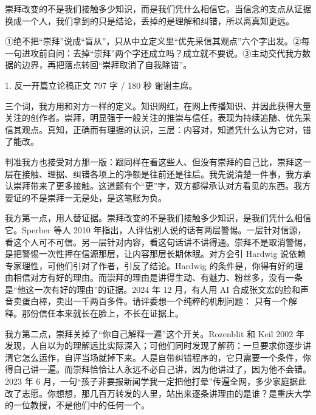 \documentclass[script,con]{debate}
\begin{document}
\debatetitle
\begin{thesisbox}[全场一句话立论]崇拜改变的不是我们接触多少知识，而是我们凭什么相信它。当信念的支点从证据换成一个人，我们拿到的只是结论，丢掉的是理解和纠错，所以离真知更远。\end{thesisbox}
\begin{thesisbox}[全场三条纪律]①绝不把“崇拜”说成“盲从”，只从中立定义里“优先采信其观点”六个字出发。②每一句进攻前自问：去掉“崇拜”两个字还成立吗？成立就不要说。③主动交代我方数据的边界，再把落点转回“崇拜取消了自我除错”。\end{thesisbox}
\begin{speech}{1. 反一开篇立论稿}{正文 797 字 / 180 秒}
谢谢主席。

三个词，我方用和对方一样的定义。知识网红，在网上传播知识、并因此获得大量关注的创作者。崇拜，明显强于一般关注的推崇与信任，表现为持续追随、优先采信其观点。真知，正确而有理据的认识，三层：内容对，知道凭什么认为它对，错了能改。

判准我方也接受对方那一版：跟同样在看这些人、但没有崇拜的自己比，崇拜这一层在接触、理据、纠错各项上的净额是往前还是往后。我先说清楚一件事，我方承认崇拜带来了更多接触。这道题有个“更”字，双方都得承认对方看见的东西。我方要证的不是崇拜一无是处，是这笔账为负。

我方第一点，用人替证据。崇拜改变的不是我们接触多少知识，是我们凭什么相信它。Sperber 等人 2010 年指出，人评估别人说的话有两层警惕。一层针对信源，看这个人可不可信。另一层针对内容，看这句话讲不讲得通。崇拜不是取消警惕，是把警惕一次性押在信源那层，让内容那层长期休眠。对方会引 Hardwig 说依赖专家理性，可他们引对了作者，引反了结论。Hardwig 的条件是，你得有好的理由相信对方有好的理由。而崇拜的理由是讲得生动、有魅力、粉丝多，没有一条是“他这一次有好的理由”的证据。2024 年 12 月，有人用 AI 合成张文宏的脸和声音卖蛋白棒，卖出一千两百多件。请评委想一个纯粹的机制问题： 只有一个解释。那份信任本来就长在脸上，不长在证据上。

我方第二点，崇拜关掉了“你自己解释一遍”这个开关。Rozenblit 和 Keil 2002 年发现，人自以为的理解远比实际深入；可他们同时发现了解药：一旦要求你逐步讲清它怎么运作，自评当场就掉下来。人是自带纠错程序的，它只需要一个条件，你得自己讲一遍。而崇拜恰恰让人永远不必自己讲，因为他讲过了，因为他不会错。2023 年 6 月，一句“孩子非要报新闻学我一定把他打晕”传遍全网，多少家庭据此改了志愿。你想想，那几百万转发的人里，站出来逐条讲理由的是谁？是重庆大学的一位教授，不是他们中的任何一个。


\end{speech}
\end{document}
